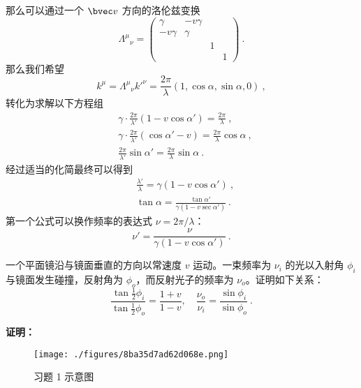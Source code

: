 那么可以通过一个 $\bvec v$ 方向的洛伦兹变换
\begin{equation}
\Lambda^\mu{}_\nu=\begin{pmatrix}
\gamma & -v\gamma &  & \\
-v\gamma & \gamma &  & \\
& & 1 & \\
& & & 1
\end{pmatrix}~.
\end{equation}
那么我们希望
\begin{equation}
k^\mu = \Lambda^\mu{}_\nu k'^\nu = \frac{2\pi}{\lambda}(1,\cos\alpha,\sin\alpha,0)~,
\end{equation}
转化为求解以下方程组
\begin{equation}
\begin{aligned}
& \gamma\cdot\frac{2\pi}{\lambda'}\left(1-v\cos\alpha'\right)=\frac{2\pi}{\lambda}~,\\
& \gamma\cdot\frac{2\pi}{\lambda'}\left(\cos\alpha'-v\right)=\frac{2\pi}{\lambda}\cos\alpha~,\\
& \frac{2\pi}{\lambda'}\sin\alpha' = \frac{2\pi }{\lambda}\sin\alpha~.
\end{aligned}
\end{equation}
经过适当的化简最终可以得到
\begin{equation}
\begin{aligned}
&\frac{\lambda'}{\lambda}=\gamma(1-v\cos\alpha')~,\\
&\tan\alpha=\frac{\tan\alpha'}{\gamma(1-v\sec \alpha')}~.
\end{aligned}
\end{equation}
第一个公式可以换作频率的表达式 $\nu=2\pi/\lambda$：
\begin{equation}
\nu'=\frac{\nu}{\gamma(1-v\cos\alpha')}~.
\end{equation}

\begin{exercise}{}
一个平面镜沿与镜面垂直的方向以常速度 $v$ 运动。一束频率为 $\nu_i$ 的光以入射角 $\phi_i$ 与镜面发生碰撞，反射角为 $\phi_o$，而反射光子的频率为 $\nu_o$。证明如下关系：
\begin{equation}
	\frac{\tan\frac{1}{2}\phi_i}{\tan\frac{1}{2}\phi_o}=\frac{1+v}{1-v},\quad \frac{\nu_o}{\nu_i}=\frac{\sin\phi_i}{\sin\phi_o}~.
\end{equation}
\end{exercise}
\textbf{证明：}
\begin{figure}[ht]
\centering
\texttt{[image: ./figures/8ba35d7ad62d068e.png]}
\caption{习题 1 示意图} \label{fig_SRkmls_1}
\end{figure}

